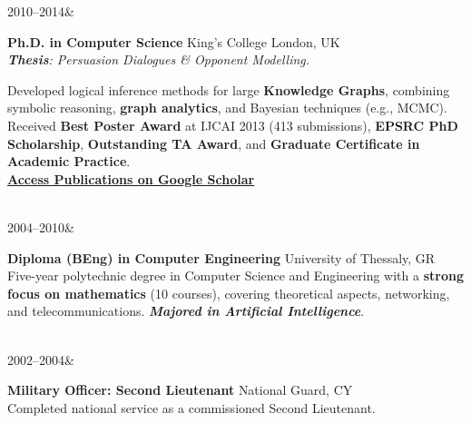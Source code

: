 \documentclass[]{../../friggeri-cv}
\renewcommand{\entrytwo}[4]{%
  #1&\parbox[t]{14cm}{%
    \textbf{#2}%
    \hfill%
    {\small\color{textcolor} #3}\\%
    #4\vspace{\parsep}%
  }\\}
\begin{document}
\begin{entrylist2}
    \entrytwo
        {\small 2010--2014}
        {\small Ph.D. in Computer Science}
        {\small King's College London, UK}
        {\small \emph{\textbf{Thesis}: Persuasion Dialogues \& Opponent Modelling.}

        {\footnotesize Developed logical inference methods for large \textbf{Knowledge Graphs}, combining symbolic reasoning, \textbf{graph analytics}, and Bayesian techniques (e.g., MCMC). Received \textbf{Best Poster Award} at IJCAI 2013 (413 submissions), \textbf{EPSRC PhD Scholarship}, \textbf{Outstanding TA Award}, and \textbf{Graduate Certificate in Academic Practice}.
        \\ \textbf{\textcolor{blue}{\href{https://scholar.google.com/citations?hl=en&user=Rr3KTx8AAAAJ}{\underline{Access Publications on Google Scholar}}}}}
        }
    \entrytwo
        {\small  2004--2010}
        {\small Diploma (BEng) in Computer Engineering}
        {\small University of Thessaly, GR}
        {\footnotesize Five-year polytechnic degree in Computer Science and Engineering with a \textbf{strong focus on mathematics} (10 courses), covering theoretical aspects, networking, and telecommunications. \emph{\textbf{Majored in Artificial Intelligence}}.}
    \entrytwo
        {\small  2002--2004}
        {\small Military Officer: Second Lieutenant}
        {\small National Guard, CY}
        {\small Completed national service as a commissioned Second Lieutenant.}
\end{entrylist2}
\end{document}
